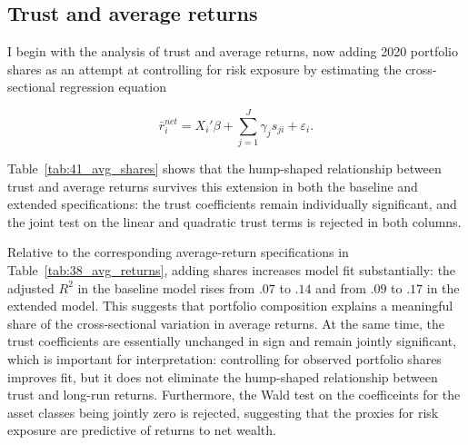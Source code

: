 \subsection{Trust and average returns}

\par I begin with the analysis of trust and average returns, now adding 2020 portfolio shares as an attempt at controlling for risk exposure by estimating the cross-sectional regression equation 

\[
\bar{r}^{net}_{i}
=
X_{i}'\beta
+ \sum_{j=1}^J \gamma_j s_{ji}
+ \varepsilon_{i}.
\]

\par Table~\ref{tab:41_avg_shares} shows that the hump-shaped relationship between trust and average returns survives this extension in both the baseline and extended specifications: the trust coefficients remain individually significant, and the joint test on the linear and quadratic trust terms is rejected in both columns.

\begin{table}[!t]
\centering
\begingroup
\setlength{\abovecaptionskip}{2pt}%
\setlength{\belowcaptionskip}{0pt}%
\caption{\textbf{Trust and Average Returns to Net Wealth with Portfolio-Share Controls}}
\label{tab:41_avg_shares}
\endgroup
\begin{threeparttable}
\begingroup
\setlength{\tabcolsep}{2pt}%
\renewcommand{\arraystretch}{0.70}%
\scriptsize%
\resizebox{\textwidth}{!}{%
%
}%
\endgroup
\begin{tablenotes}[flushleft]
\scriptsize
\item {}%
\end{tablenotes}
\end{threeparttable}
\end{table}


\par Relative to the corresponding average-return specifications in Table~\ref{tab:38_avg_returns}, adding shares increases model fit substantially: the adjusted $R^2$ in the baseline model rises from $.07$ to $.14$ and from $.09$ to $.17$ in the extended model. This suggests that portfolio composition explains a meaningful share of the cross-sectional variation in average returns. At the same time, the trust coefficients are essentially unchanged in sign and remain jointly significant, which is important for interpretation: controlling for observed portfolio shares improves fit, but it does not eliminate the hump-shaped relationship between trust and long-run returns. Furthermore, the Wald test on the coefficeints for the asset classes being jointly zero is rejected, suggesting that the proxies for risk exposure are predictive of returns to net wealth. 

